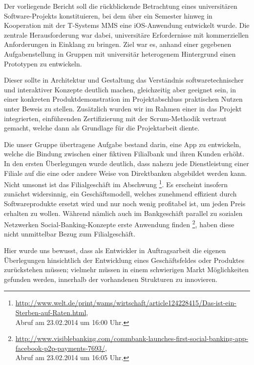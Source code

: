 	Der vorliegende Bericht soll die rückblickende Betrachtung eines universitären Software-Pro\-jekts konstituieren, bei dem über ein Semester hinweg in Kooperation mit der T-Systems MMS eine iOS-Anwendung entwickelt wurde. Die zentrale Herausforderung war dabei, universitäre Erfordernisse mit kommerziellen Anforderungen in Einklang zu bringen. Ziel war es, anhand einer gegebenen Aufgabenstellung in Gruppen mit universitär heterogenem Hintergrund einen Prototypen zu entwickeln.
	
	Dieser sollte in Architektur und Gestaltung das Verständnis softwaretechnischer und interaktiver Konzepte deutlich machen, gleichzeitig aber geeignet sein, in einer konkreten Produktdemonstration im Projektabschluss praktischen Nutzen unter Beweis zu stellen. Zusätzlich wurden wir im Rahmen einer in das Projekt integrierten, einführenden Zertifizierung mit der Scrum-Methodik vertraut gemacht, welche dann als Grundlage für die Projektarbeit diente. 

	Die unser Gruppe übertragene Aufgabe bestand darin, eine App zu entwickeln, welche die Bindung zwischen einer fiktiven Filialbank und ihren Kunden erhöht. In den ersten Überlegungen wurde deutlich, dass nahezu jede Dienstleistung einer Filiale auf die eine oder andere Weise von Direktbanken abgebildet werden kann. Nicht umsonst ist das Filialgeschäft im Abschwung \footnote{\url{http://www.welt.de/print/wams/wirtschaft/article124228415/Das-ist-ein-Sterben-auf-Raten.html}, \\Abruf am 23.02.2014 um 16:00 Uhr.}. Es erscheint insofern zunächst widersinnig, ein Geschäftsmodell, welches zunehmend effizient durch Softwareprodukte ersetzt wird und nur noch wenig profitabel ist, um jeden Preis erhalten zu wollen. Während nämlich auch im Bankgeschäft parallel zu sozialen Netzwerken Social-Banking-Konzepte erste Anwendung finden \footnote{\url{http://www.visiblebanking.com/commbank-launches-first-social-banking-app-facebook-p2p-payments-7693/},\\ Abruf am 23.02.2014 um 16:05 Uhr.}, haben diese nicht unmittelbar Bezug zum Filialgeschäft.
	 
	Hier wurde uns bewusst, dass als Entwickler in Auftragsarbeit die eigenen Überlegungen hinsichtlich der Entwicklung eines Geschäftsfeldes oder Produktes zurückstehen müssen; vielmehr müssen in einem schwierigen Markt Möglichkeiten gefunden werden, innerhalb der vorhandenen Strukturen zu innovieren.
	 